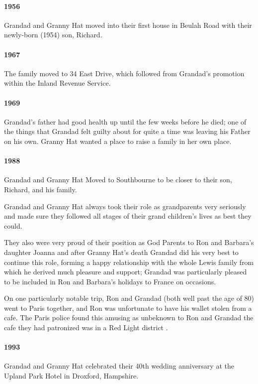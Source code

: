 \paragraph{1956} Grandad and Granny Hat moved into their first house in Beulah Road with their newly-born (1954) son, Richard.
\paragraph{1967} The family moved to 34 East Drive, which followed from Grandad's promotion within
the Inland Revenue Service.
\paragraph{1969} Grandad's father had good health up until the few weeks before he died; one
of the things that Grandad felt guilty about for quite a time was leaving his Father on his own. Granny Hat  wanted
a place to raise a family in her own place.
\paragraph{1988} Grandad and Granny Hat Moved to Southbourne to be closer to their son, Richard, and his family.

Grandad and Granny Hat always took their role as grandparents very seriously and made sure they followed all
stages of their grand children's lives as best they could.

They also were very proud of their position as God
Parents to Ron and Barbara's daughter Joanna and after Granny Hat's death Grandad did his very best to
continue this role, forming a happy relationship with the whole Lewis family from which he derived much pleasure and support;
Grandad was particularly pleased to be included in Ron and Barbara's holidays to France on occasions.

On one particularly notable trip, Ron and Grandad (both well past the age of 80) went to Paris together, and Ron
was unfortunate to have his wallet stolen from a cafe. The Paris police found this amusing
as unbeknown to Ron and Grandad the cafe they had patronized was in a Red Light district .

\paragraph{1993} Grandad and Granny Hat celebrated their 40th wedding anniversary
at the Upland Park Hotel in Droxford, Hampshire.

